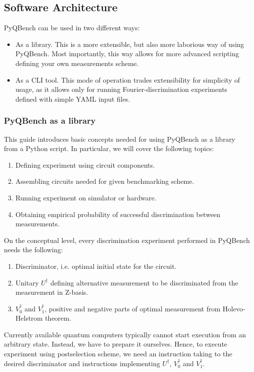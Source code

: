 \documentclass[preprint,12pt, a4paper, dvipsnames]{elsarticle}
\newcommand{\1}{{\rm 1\hspace{-0.9mm}l}}
\begin{document}
\subsection{Software Architecture}\label{sec:sortware-architecture}
PyQBench can be used in two different ways:
\begin{itemize}
\item As a library. This is a more extensible, but also more laborious way of using PyQBench. Most importantly, this way allows for more advanced scripting defining your own measurements scheme.

\item As a CLI tool. This mode of operation trades extensibility for simplicity of usage, as it allows only for running Fourier-discrimination experiments defined with simple YAML input files.
\end{itemize}


\subsubsection{PyQBench as a library}\label{sec:pyqbench-as-library}
This guide introduces basic concepts needed for using PyQBench as a library from a Python script. In particular, we will cover the following topics:
\begin{enumerate}
\item Defining experiment using circuit components.
\item Assembling circuits needed for given benchmarking scheme.
\item Running experiment on simulator or hardware.
\item Obtaining empirical probability of successful discrimination between measurements.
\end{enumerate}

On the conceptual level, every discrimination experiment performed in PyQBench needs the following:
\begin{enumerate}
\item Discriminator, i.e. optimal initial state for the circuit.
\item Unitary $U^\dagger$ defining alternative measurement to be discriminated from the measurement in Z-basis.
\item $V_0^\dagger$ and $V_1^\dagger$, positive and negative parts of optimal measurement from Holevo-Helstrom theorem.
\end{enumerate}
Currently available quantum computers typically cannot start execution from an arbitrary state. Instead, we have to prepare it ourselves. Hence, to execute experiment using postselection scheme, we need an instruction taking to the desired discriminator
and instructions implementing $U^\dagger$, $V_0^\dagger$ and $V_1^\dagger$.
\end{document}
